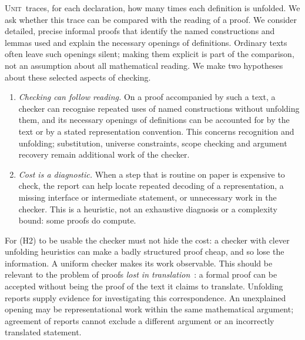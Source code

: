 \documentclass[11pt]{article}
\newcommand{\sys}{\textsc{Unit}}
\begin{document}
\sys\ traces, for each declaration, how many times each definition is
unfolded. We ask whether this trace can be compared with the reading of a proof. We consider detailed, precise informal
proofs that identify the named constructions and lemmas used and explain
the necessary openings of definitions. Ordinary texts often leave such
openings silent; making them explicit is part of the comparison, not an
assumption about all mathematical reading. We make two hypotheses about
these selected aspects of checking.
\begin{enumerate}
\item[(H1)] \emph{Checking can follow reading.} On a proof accompanied
  by such a text, a checker can recognise repeated uses of named
  constructions without unfolding them, and its necessary openings of
  definitions can be accounted for by the text or by a stated
  representation convention. This concerns recognition and unfolding;
  substitution, universe constraints, scope checking and argument
  recovery remain additional work of the checker.
\item[(H2)] \emph{Cost is a diagnostic.} When a step that is routine on
  paper is expensive to check, the report can help locate repeated
  decoding of a representation, a missing interface or intermediate
  statement, or unnecessary work in the checker. This is a heuristic,
  not an exhaustive diagnosis or a complexity bound: some proofs do
  compute.
\end{enumerate}
For (H2) to be usable the checker must not hide the cost: a checker with
clever unfolding heuristics can make a badly structured proof cheap, and
so lose the information. A uniform checker makes its work observable.
This should be relevant to the problem of proofs \emph{lost in
translation}~\cite{BCH}: a formal proof can be accepted without being the
proof of the text it claims to translate. Unfolding reports supply
evidence for investigating this correspondence. An unexplained opening
may be representational work within the same mathematical argument;
agreement of reports cannot exclude a different argument or an
incorrectly translated statement.
\end{document}
